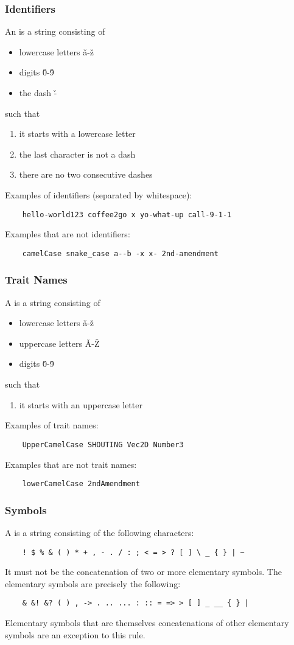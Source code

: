 \documentclass{article}
\begin{document}
\subsubsection{Identifiers}
An \tident is a string consisting of
\begin{itemize}
    \item lowercase letters \v a-\v z
    \item digits \v0-\v9
    \item the dash \v-
\end{itemize}
such that
\begin{enumerate}
    \item it starts with a lowercase letter
    \item the last character is not a dash
    \item there are no two consecutive dashes
\end{enumerate}
Examples of identifiers (separated by whitespace):
\begin{verbatim}
    hello-world123 coffee2go x yo-what-up call-9-1-1
\end{verbatim}
Examples that are not identifiers:
\begin{verbatim}
    camelCase snake_case a--b -x x- 2nd-amendment
\end{verbatim}

\subsubsection{Trait Names}
A \ttrait is a string consisting of
\begin{itemize}
    \item lowercase letters \v a-\v z
    \item uppercase letters \v A-\v Z
    \item digits \v0-\v9
\end{itemize}
such that
\begin{enumerate}
    \item it starts with an uppercase letter
\end{enumerate}
Examples of trait names:
\begin{verbatim}
    UpperCamelCase SHOUTING Vec2D Number3 
\end{verbatim}
Examples that are not trait names:
\begin{verbatim}
    lowerCamelCase 2ndAmendment
\end{verbatim}
\subsubsection{Symbols}
A \tsym is a string consisting of the following
characters:
\begin{verbatim}
    ! $ % & ( ) * + , - . / : ; < = > ? [ ] \ _ { } | ~
\end{verbatim}
It must not be the concatenation of two or more
elementary symbols.
The elementary symbols are precisely the following:
\begin{verbatim}
    & &! &? ( ) , -> . .. ... : :: = => > [ ] _ __ { } |
\end{verbatim}
Elementary symbols that are themselves concatenations of
other elementary symbols are an exception to this rule.
\end{document}
